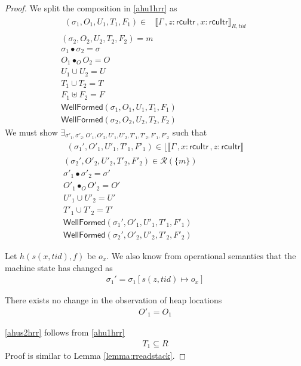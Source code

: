 \begin{proof}
We split the composition in  \ref{ahu1hrr} as 
\begin{gather} \label{ahu11hrr}
  \begin{aligned}
    (\sigma_1, O_{1}, U_{1}, T_{1},F_1 ) \in &  \llbracket \Gamma\, , z:\textsf{rcuItr}\, ,  x:\textsf{rcuItr}  \rrbracket_{R,tid} \end{aligned}\\
  \label{ahu12hrr}
(\sigma_2, O_{2}, U_{2}, T_{2},F_2) = m
  \\
  \label{ahusighrr}
  \sigma_1 \bullet \sigma_2 = \sigma
  \\
\label{ahu13hrr}
O_{1} \bullet_{O} O_{2} = O
\\
\label{ahu14hrr}
U_{1} \cup U_{2} = U
\\
\label{ahu15hrr}
T_{1} \cup T_{2} = T
\\
\label{ahuhrrf}
F_1 \uplus F_2 = F
\\
\label{ahu16hrr}
\textsf{WellFormed}(\sigma_1,O_{1},U_{1},T_{1},F_1)
\\
\label{ahu17hrr}
\textsf{WellFormed}(\sigma_2,O_{2},U_{2},T_{2},F_2)
\end{gather}
We must show  $\exists_{\sigma'_1,\sigma'_2,O'_{1}, O'_{2}, U'_{1}, U'_{2}, T'_{1}, T'_{2},F'_1,F'_2}$ such that
\begin{gather}\label{phu5fhrr}
\begin{aligned}
(\sigma_1',O'_{1},U'_{1}, T'_{1},F'_1)  \in   \lfloor \llbracket \Gamma\,,  x:\textsf{rcuItr} \, ,z:\textsf{rcuItr}  \rrbracket  
\end{aligned}\\
\label{phu6hrr}
(\sigma_2',O'_{2},U'_{2}, T'_{2}, F'_2) \in \mathcal{R}(\{m\})
\\
  \label{ahusighrr'}
  \sigma'_1 \bullet \sigma'_2 = \sigma'
\\
\label{phu7hrr}
O'_{1} \bullet_{O} O'_{2} = O'
\\
\label{phu8hrr}
U'_{1} \cup U'_{2} = U'
\\
\label{phu9hrr}
T'_{1} \cup T'_{2} = T'
\\
\label{phu10hrr}
\textsf{WellFormed}(\sigma_1',O'_{1},U'_{1},T'_{1},F'_1) \\
\label{phu11hrr}
\textsf{WellFormed}(\sigma_2',O'_{2},U'_{2},T'_{2},F'_2)
\end{gather}

Let $h(s(x,tid),f)$ be $o_x$. We also know from operational semantics that the machine state has changed as
\begin{gather}\label{ahushrr}
\sigma_1' =  \sigma_1[s(z,tid)\mapsto o_x]
\end{gather}

There exists no change in the observation of heap locations
\begin{gather}\label{ahus1hrr}
  O'_1 =  O_1
\end{gather}

\ref{ahus2hrr} follows from \ref{ahu1hrr}
\begin{gather}\label{ahus2hrr}
  T_1 \subseteq R
\end{gather}
Proof is similar to Lemma \ref{lemma:rreadstack}.
      \end{proof}

